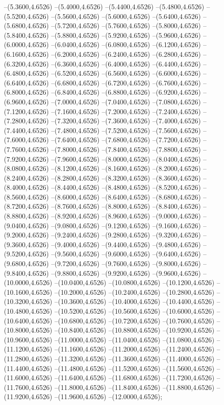 {	--(5.3600,4.6526)
	--(5.4000,4.6526)
	--(5.4400,4.6526)
	--(5.4800,4.6526)
	--(5.5200,4.6526)
	--(5.5600,4.6526)
	--(5.6000,4.6526)
	--(5.6400,4.6526)
	--(5.6800,4.6526)
	--(5.7200,4.6526)
	--(5.7600,4.6526)
	--(5.8000,4.6526)
	--(5.8400,4.6526)
	--(5.8800,4.6526)
	--(5.9200,4.6526)
	--(5.9600,4.6526)
	--(6.0000,4.6526)
	--(6.0400,4.6526)
	--(6.0800,4.6526)
	--(6.1200,4.6526)
	--(6.1600,4.6526)
	--(6.2000,4.6526)
	--(6.2400,4.6526)
	--(6.2800,4.6526)
	--(6.3200,4.6526)
	--(6.3600,4.6526)
	--(6.4000,4.6526)
	--(6.4400,4.6526)
	--(6.4800,4.6526)
	--(6.5200,4.6526)
	--(6.5600,4.6526)
	--(6.6000,4.6526)
	--(6.6400,4.6526)
	--(6.6800,4.6526)
	--(6.7200,4.6526)
	--(6.7600,4.6526)
	--(6.8000,4.6526)
	--(6.8400,4.6526)
	--(6.8800,4.6526)
	--(6.9200,4.6526)
	--(6.9600,4.6526)
	--(7.0000,4.6526)
	--(7.0400,4.6526)
	--(7.0800,4.6526)
	--(7.1200,4.6526)
	--(7.1600,4.6526)
	--(7.2000,4.6526)
	--(7.2400,4.6526)
	--(7.2800,4.6526)
	--(7.3200,4.6526)
	--(7.3600,4.6526)
	--(7.4000,4.6526)
	--(7.4400,4.6526)
	--(7.4800,4.6526)
	--(7.5200,4.6526)
	--(7.5600,4.6526)
	--(7.6000,4.6526)
	--(7.6400,4.6526)
	--(7.6800,4.6526)
	--(7.7200,4.6526)
	--(7.7600,4.6526)
	--(7.8000,4.6526)
	--(7.8400,4.6526)
	--(7.8800,4.6526)
	--(7.9200,4.6526)
	--(7.9600,4.6526)
	--(8.0000,4.6526)
	--(8.0400,4.6526)
	--(8.0800,4.6526)
	--(8.1200,4.6526)
	--(8.1600,4.6526)
	--(8.2000,4.6526)
	--(8.2400,4.6526)
	--(8.2800,4.6526)
	--(8.3200,4.6526)
	--(8.3600,4.6526)
	--(8.4000,4.6526)
	--(8.4400,4.6526)
	--(8.4800,4.6526)
	--(8.5200,4.6526)
	--(8.5600,4.6526)
	--(8.6000,4.6526)
	--(8.6400,4.6526)
	--(8.6800,4.6526)
	--(8.7200,4.6526)
	--(8.7600,4.6526)
	--(8.8000,4.6526)
	--(8.8400,4.6526)
	--(8.8800,4.6526)
	--(8.9200,4.6526)
	--(8.9600,4.6526)
	--(9.0000,4.6526)
	--(9.0400,4.6526)
	--(9.0800,4.6526)
	--(9.1200,4.6526)
	--(9.1600,4.6526)
	--(9.2000,4.6526)
	--(9.2400,4.6526)
	--(9.2800,4.6526)
	--(9.3200,4.6526)
	--(9.3600,4.6526)
	--(9.4000,4.6526)
	--(9.4400,4.6526)
	--(9.4800,4.6526)
	--(9.5200,4.6526)
	--(9.5600,4.6526)
	--(9.6000,4.6526)
	--(9.6400,4.6526)
	--(9.6800,4.6526)
	--(9.7200,4.6526)
	--(9.7600,4.6526)
	--(9.8000,4.6526)
	--(9.8400,4.6526)
	--(9.8800,4.6526)
	--(9.9200,4.6526)
	--(9.9600,4.6526)
	--(10.0000,4.6526)
	--(10.0400,4.6526)
	--(10.0800,4.6526)
	--(10.1200,4.6526)
	--(10.1600,4.6526)
	--(10.2000,4.6526)
	--(10.2400,4.6526)
	--(10.2800,4.6526)
	--(10.3200,4.6526)
	--(10.3600,4.6526)
	--(10.4000,4.6526)
	--(10.4400,4.6526)
	--(10.4800,4.6526)
	--(10.5200,4.6526)
	--(10.5600,4.6526)
	--(10.6000,4.6526)
	--(10.6400,4.6526)
	--(10.6800,4.6526)
	--(10.7200,4.6526)
	--(10.7600,4.6526)
	--(10.8000,4.6526)
	--(10.8400,4.6526)
	--(10.8800,4.6526)
	--(10.9200,4.6526)
	--(10.9600,4.6526)
	--(11.0000,4.6526)
	--(11.0400,4.6526)
	--(11.0800,4.6526)
	--(11.1200,4.6526)
	--(11.1600,4.6526)
	--(11.2000,4.6526)
	--(11.2400,4.6526)
	--(11.2800,4.6526)
	--(11.3200,4.6526)
	--(11.3600,4.6526)
	--(11.4000,4.6526)
	--(11.4400,4.6526)
	--(11.4800,4.6526)
	--(11.5200,4.6526)
	--(11.5600,4.6526)
	--(11.6000,4.6526)
	--(11.6400,4.6526)
	--(11.6800,4.6526)
	--(11.7200,4.6526)
	--(11.7600,4.6526)
	--(11.8000,4.6526)
	--(11.8400,4.6526)
	--(11.8800,4.6526)
	--(11.9200,4.6526)
	--(11.9600,4.6526)
	--(12.0000,4.6526);
}
